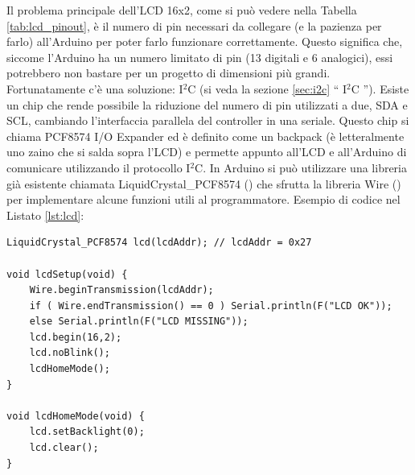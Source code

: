 \documentclass[12pt]{report}
\begin{document}
Il problema principale dell'LCD 16x2, come si può vedere nella Tabella \ref{tab:lcd_pinout}, è il numero di pin necessari da collegare (e la pazienza per farlo) all'Arduino per poter farlo funzionare correttamente. Questo significa che, siccome l'Arduino ha un numero limitato di pin (13 digitali e 6 analogici), essi potrebbero non bastare per un progetto di dimensioni più grandi. Fortunatamente c'è una soluzione: I$^2$C (si veda la sezione \ref{sec:i2c} \textquotedblleft{} I$^2$C \textquotedblright{}). Esiste un chip che rende possibile la riduzione del numero di pin utilizzati a due, SDA e SCL, cambiando l'interfaccia parallela del controller in una seriale. Questo chip si chiama PCF8574 I/O Expander ed è definito come un backpack (è letteralmente uno zaino che si salda sopra l'LCD) e permette appunto all'LCD e all'Arduino di comunicare utilizzando il protocollo I$^2$C. In Arduino si può utilizzare una libreria già esistente chiamata LiquidCrystal\_PCF8574 (\cite{lcd_lib}) che sfrutta la libreria Wire (\cite{wire}) per implementare alcune funzioni utili al programmatore. Esempio di codice nel Listato \ref{lst:lcd}:
\begin{lstlisting}[caption={L'Arduino inizializza la comunicazione con l'LCD tramite il protocollo I$^2$C e chiama la funzione lcdHomeMode() che semplicemente spegne la retroilluminazione e pulisce il testo.}, label={lst:lcd}]
LiquidCrystal_PCF8574 lcd(lcdAddr); // lcdAddr = 0x27

void lcdSetup(void) {
	Wire.beginTransmission(lcdAddr);
	if ( Wire.endTransmission() == 0 ) Serial.println(F("LCD OK"));
	else Serial.println(F("LCD MISSING"));
	lcd.begin(16,2);
	lcd.noBlink();
	lcdHomeMode();
}

void lcdHomeMode(void) {
	lcd.setBacklight(0);
	lcd.clear();
}

\end{lstlisting}
\end{document}
